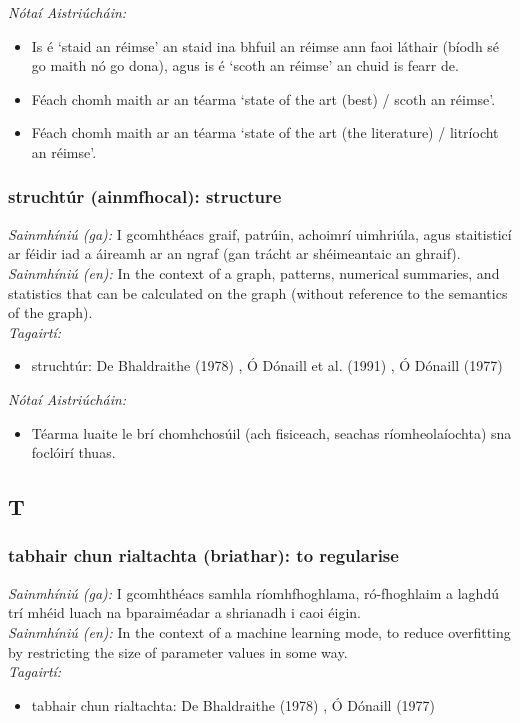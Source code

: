 \documentclass{article}
\begin{document}
 \noindent \textit{Nótaí Aistriúcháin:}
\begin{itemize}
	\item Is é `staid an réimse' an staid ina bhfuil an réimse ann faoi láthair (bíodh sé go maith nó go dona), agus is é `scoth an réimse' an chuid is fearr de.
	\item Féach chomh maith ar an téarma `state of the art (best) / scoth an réimse'.
	\item Féach chomh maith ar an téarma `state of the art (the literature) / litríocht an réimse'.
\end{itemize}


\subsubsection*{struchtúr (ainmfhocal): structure}
 \noindent \textit{Sainmhíniú (ga):} I gcomhthéacs graif, patrúin, achoimrí uimhriúla, agus staitisticí ar féidir iad a áireamh ar an ngraf (gan trácht ar shéimeantaic an ghraif).
\\
 \noindent \textit{Sainmhíniú (en):} In the context of a graph, patterns, numerical summaries, and statistics that can be calculated on the graph (without reference to the semantics of the graph).
\\
 \noindent \textit{Tagairtí:}
\begin{itemize}
	\item struchtúr: De Bhaldraithe (1978) \cite{de-bhaldraithe}, Ó Dónaill et al. (1991) \cite{focloir-beag}, Ó Dónaill (1977) \cite{odonaill}
\end{itemize}

 \noindent \textit{Nótaí Aistriúcháin:}
\begin{itemize}
	\item Téarma luaite le brí chomhchosúil (ach fisiceach, seachas ríomheolaíochta) sna foclóirí thuas.
\end{itemize}


\subsection*{T}

\subsubsection*{tabhair chun rialtachta (briathar): to regularise}
 \noindent \textit{Sainmhíniú (ga):} I gcomhthéacs samhla ríomhfhoghlama, ró-fhoghlaim a laghdú trí mhéid luach na bparaiméadar a shrianadh i caoi éigin.
\\
 \noindent \textit{Sainmhíniú (en):} In the context of a machine learning mode, to reduce overfitting by restricting the size of parameter values in some way.
\\
 \noindent \textit{Tagairtí:}
\begin{itemize}
	\item tabhair chun rialtachta: De Bhaldraithe (1978) \cite{de-bhaldraithe}, Ó Dónaill (1977) \cite{odonaill}
\end{itemize}
\end{document}
